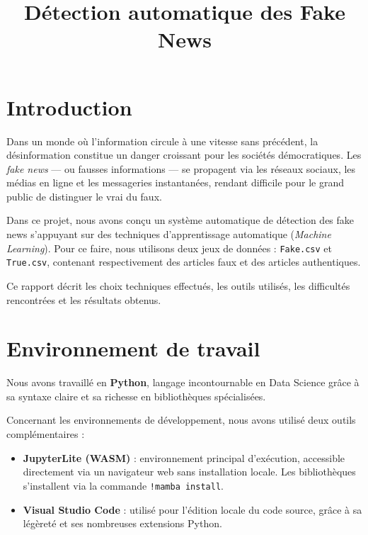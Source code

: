 \documentclass[a4paper, 12pt, twoside]{article}
\title{Détection automatique des Fake News}
\begin{document}
\pagedegarde

\tableofcontents
\newpage

\section{Introduction}

Dans un monde où l'information circule à une vitesse sans précédent, la
désinformation constitue un danger croissant pour les sociétés démocratiques.
Les \textit{fake news} --- ou fausses informations --- se propagent via les
réseaux sociaux, les médias en ligne et les messageries instantanées, rendant
difficile pour le grand public de distinguer le vrai du faux.

Dans ce projet, nous avons conçu un système automatique de détection des
fake news s'appuyant sur des techniques d'apprentissage automatique
(\textit{Machine Learning}). Pour ce faire, nous utilisons deux jeux de
données : \texttt{Fake.csv} et \texttt{True.csv}, contenant respectivement
des articles faux et des articles authentiques.

Ce rapport décrit les choix techniques effectués, les outils utilisés, les
difficultés rencontrées et les résultats obtenus.

\section{Environnement de travail}

Nous avons travaillé en \textbf{Python}, langage incontournable en Data
Science grâce à sa syntaxe claire et sa richesse en bibliothèques spécialisées.

Concernant les environnements de développement, nous avons utilisé deux outils
complémentaires :

\begin{itemize}
  \item \textbf{JupyterLite (WASM)} : environnement principal d'exécution,
        accessible directement via un navigateur web sans installation locale.
        Les bibliothèques s'installent via la commande \texttt{!mamba install}.
  \item \textbf{Visual Studio Code} : utilisé pour l'édition locale du code
        source, grâce à sa légèreté et ses nombreuses extensions Python.
\end{itemize}
\end{document}
